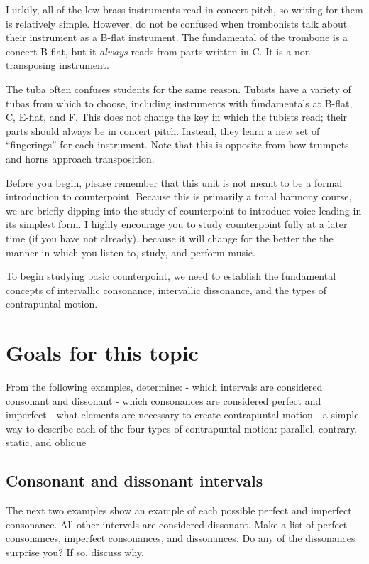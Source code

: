 \documentclass{book}
\begin{document}
Luckily, all of the low brass instruments read in concert pitch, so writing
for them is relatively simple. However, do not be confused when trombonists
talk about their instrument as a B-flat instrument. The fundamental of the
trombone is a concert B-flat, but it \emph{always} reads from parts written in
C. It is a non-transposing instrument.

The tuba often confuses students for the same reason. Tubists have a variety
of tubas from which to choose, including instruments with fundamentals at
B-flat, C, E-flat, and F. This does not change the key in which the tubists
read; their parts should always be in concert pitch. Instead, they learn a new
set of ``fingerings'' for each instrument. Note that this is opposite from how
trumpets and horns approach transposition.

Before you begin, please remember that this unit is not meant to be a formal
introduction to counterpoint. Because this is primarily a tonal harmony
course, we are briefly dipping into the study of counterpoint to introduce
voice-leading in its simplest form. I highly encourage you to study
counterpoint fully at a later time (if you have not already), because it will
change for the better the the manner in which you listen to, study, and
perform music.

To begin studying basic counterpoint, we need to establish the fundamental
concepts of intervallic consonance, intervallic dissonance, and the types of
contrapuntal motion.

\hypertarget{goals-for-this-topic-1}{%
\section{Goals for this topic}\label{goals-for-this-topic-1}}

From the following examples, determine: - which intervals are considered
consonant and dissonant - which consonances are considered perfect and
imperfect - what elements are necessary to create contrapuntal motion - a
simple way to describe each of the four types of contrapuntal motion:
parallel, contrary, static, and oblique

\hypertarget{consonant-and-dissonant-intervals}{%
\subsection{Consonant and dissonant
intervals}\label{consonant-and-dissonant-intervals}}

The next two examples show an example of each possible perfect and imperfect
consonance. All other intervals are considered dissonant. Make a list of
perfect consonances, imperfect consonances, and dissonances. Do any of the
dissonances surprise you? If so, discuss why.
\end{document}
